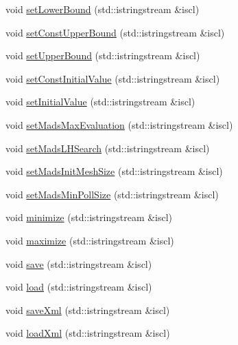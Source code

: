 \begin{DoxyCompactItemize}
\item 
void \hyperlink{class_go_s_u_m_1_1_c_script_ac3c8fda5e692efadaa920ff6112212cb}{set\-Lower\-Bound} (std\-::istringstream \&iscl)
\item 
void \hyperlink{class_go_s_u_m_1_1_c_script_af9d64ebfd552df3c845d732ed1550d33}{set\-Const\-Upper\-Bound} (std\-::istringstream \&iscl)
\item 
void \hyperlink{class_go_s_u_m_1_1_c_script_a130e3bf91f74663adda52c97007d221b}{set\-Upper\-Bound} (std\-::istringstream \&iscl)
\item 
void \hyperlink{class_go_s_u_m_1_1_c_script_add1d6db49a625f22abd4ade32b7dd85d}{set\-Const\-Initial\-Value} (std\-::istringstream \&iscl)
\item 
void \hyperlink{class_go_s_u_m_1_1_c_script_a91528ab0d0ab138fee82d9a25bc27920}{set\-Initial\-Value} (std\-::istringstream \&iscl)
\item 
void \hyperlink{class_go_s_u_m_1_1_c_script_a02f1e28faf36d038a41a22523f5a8913}{set\-Mads\-Max\-Evaluation} (std\-::istringstream \&iscl)
\item 
void \hyperlink{class_go_s_u_m_1_1_c_script_a1b3627fa5e60605390601792c346742f}{set\-Mads\-L\-H\-Search} (std\-::istringstream \&iscl)
\item 
void \hyperlink{class_go_s_u_m_1_1_c_script_aeeaaf1250133763b77d76d4b3a596981}{set\-Mads\-Init\-Mesh\-Size} (std\-::istringstream \&iscl)
\item 
void \hyperlink{class_go_s_u_m_1_1_c_script_ae992b0f41a3001021498152a1ffb7be8}{set\-Mads\-Min\-Poll\-Size} (std\-::istringstream \&iscl)
\item 
void \hyperlink{class_go_s_u_m_1_1_c_script_a98f0a704b09a616af9c2b396c1a42bef}{minimize} (std\-::istringstream \&iscl)
\item 
void \hyperlink{class_go_s_u_m_1_1_c_script_a270541844d1c34de201598a21d1cffd4}{maximize} (std\-::istringstream \&iscl)
\item 
void \hyperlink{class_go_s_u_m_1_1_c_script_afe31685f7f6a404c7eff3a3478e53021}{save} (std\-::istringstream \&iscl)
\item 
void \hyperlink{class_go_s_u_m_1_1_c_script_a0ac0f0522dc2f5ac7efba45beed9f123}{load} (std\-::istringstream \&iscl)
\item 
void \hyperlink{class_go_s_u_m_1_1_c_script_ad69e6d10860b29b5da51210b562be473}{save\-Xml} (std\-::istringstream \&iscl)
\item 
void \hyperlink{class_go_s_u_m_1_1_c_script_a0c4edd71b685e35c9bb8804e8cb034cc}{load\-Xml} (std\-::istringstream \&iscl)

\end{DoxyCompactItemize}
